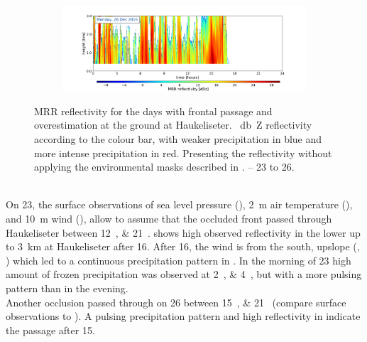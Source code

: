 \begin{figure}[H]
\begin{subfigure}[t]{\textwidth}
		\caption{}\label{fig:ret:refl26}
	\end{subfigure}
	\begin{subfigure}[t]{\textwidth}
		\includegraphics[trim={6.5cm 0cm 5.3cm 15.5cm},clip,width=\textwidth]{./fig_MRR_refl/MRR_20161226}
	\end{subfigure}
	\caption{MRR reflectivity for the days with frontal passage and overestimation at the ground at Haukeliseter. \SI{}{\decibel Z} reflectivity according to the colour bar, with weaker precipitation in blue and more intense precipitation in red. Presenting the reflectivity without applying the environmental masks described in . \protect{}--\protect{} \num{23} to \SI{26}{\dec}.}\label{fig:ret:refl}
\end{figure}
\noindent
\\
On \SI{23}{\dec}, the surface observations of sea level pressure (), \SI{2}{\metre} air temperature (), and \SI{10}{\metre} wind (), allow to assume that the occluded front passed through Haukeliseter between \SIlist{12;21}{\UTC}.
 shows high observed reflectivity in the lower up to \SI{3}{\km} at Haukeliseter after \SI{16}{\UTC}.
After \SI{16}{\UTC}, the wind is from the south, upslope (, ) which led to a continuous precipitation pattern in . 
In the morning of \SI{23}{\dec} high amount of frozen precipitation was observed at \SIlist{2;4}{\UTC}, but with a more pulsing pattern than in the evening.
\\
Another occlusion passed through on \SI{26}{\dec} between \SIlist{15;21}{\UTC} (compare surface observations  to ). A pulsing precipitation pattern and high reflectivity in  indicate the passage after \SI{15}{\UTC}. 
